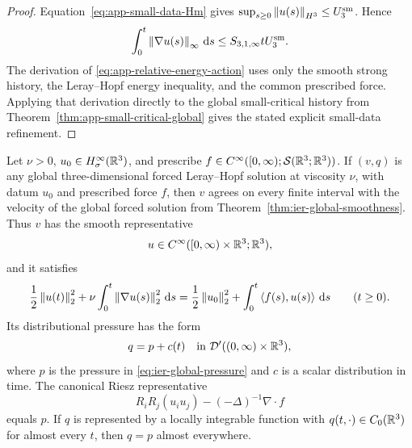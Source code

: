 \begin{proof}
Equation~\eqref{eq:app-small-data-Hm} gives
\(\sup_{s\ge0}\left\lVert u(s)\right\rVert_{H^3}\le U_3^{\rm sm}\).  Hence
\[
 \int_0^t\left\lVert \nabla u(s)\right\rVert_\infty\,\mathrm d s
 \le S_{3,1,\infty}tU_3^{\rm sm}.
\]
The derivation of \eqref{eq:app-relative-energy-action} uses only the smooth
strong history, the Leray--Hopf energy inequality, and the common prescribed
force.  Applying that derivation directly to the global small-critical history
from Theorem~\ref{thm:app-small-critical-global} gives the stated explicit
small-data refinement.
\end{proof}

\begin{corollary}
\label{cor:app-leray-uniqueness}
Let \(\nu>0\), \(u_0\in H^\infty_\sigma(\mathbb R^3)\), and prescribe
\(f\in C^\infty([0,\infty);\mathcal S(\mathbb R^3;\mathbb R^3))\).  If \((v,q)\) is any
global three-dimensional forced Leray--Hopf solution at viscosity \(\nu\),
with datum \(u_0\) and prescribed force \(f\), then \(v\) agrees on every
finite interval with the velocity of the global forced solution from
Theorem~\ref{thm:ier-global-smoothness}.  Thus \(v\) has
the smooth
representative
\[
 u\in C^\infty([0,\infty)\times\mathbb R^3;\mathbb R^3),
\]
and it satisfies
\[
 \frac12\left\lVert u(t)\right\rVert_2^2
 +\nu\int_0^t\left\lVert \nabla u(s)\right\rVert_2^2\,\mathrm d s
 =\frac12\left\lVert u_0\right\rVert_2^2
 +\int_0^t\left\langle f(s),u(s)\right\rangle\,\mathrm d s
 \qquad(t\ge0).
\]
Its distributional pressure has the form
\begin{equation}
 q=p+c(t)
 \quad\text{in }\mathcal D'((0,\infty)\times\mathbb R^3),
 \label{eq:app-weak-pressure-gauge}
\end{equation}
where \(p\) is the pressure in \eqref{eq:ier-global-pressure} and \(c\) is a
scalar distribution in time.  The canonical Riesz representative
\[
 R_iR_j(u_i u_j)-(-\Delta)^{-1}\nabla\cdot f
\]
equals \(p\).  If \(q\) is represented by a locally
integrable function with \(q(t,\cdot)\in C_0(\mathbb R^3)\) for almost every \(t\),
then \(q=p\) almost everywhere.
\end{corollary}

